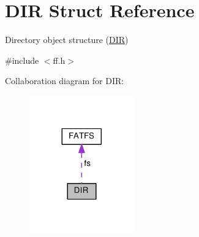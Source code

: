 \hypertarget{structDIR}{}\section{D\+IR Struct Reference}
\label{structDIR}


Directory object structure (\hyperlink{structDIR}{D\+IR})  




{\ttfamily \#include $<$ff.\+h$>$}



Collaboration diagram for D\+IR\+:\nopagebreak
\begin{figure}[H]
\begin{center}
\leavevmode
\includegraphics[width=128pt]{structDIR__coll__graph}
\end{center}
\end{figure}
